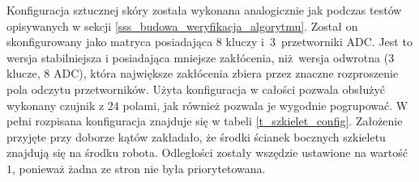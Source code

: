 Konfiguracja sztucznej skóry została wykonana analogicznie jak podczas testów opisywanych w sekcji \ref{sss_budowa_weryfikacja_algorytmu}. Został on skonfigurowany jako matryca posiadająca $8$ kluczy i~$3$~przetworniki ADC. Jest to wersja stabilniejsza i posiadająca mniejsze zakłócenia, niż~wersja odwrotna ($3$ klucze, $8$ ADC), która największe zakłócenia zbiera przez znaczne rozproszenie pola odczytu przetworników. Użyta konfiguracja w całości pozwala obsłużyć wykonany czujnik z $24$ polami, jak również pozwala je wygodnie pogrupować. W pełni rozpisana konfiguracja znajduje się w tabeli \ref{t_szkielet_config}. Założenie przyjęte przy doborze kątów zakładało, że środki ścianek bocznych szkieletu znajdują się na środku robota. Odległości zostały wszędzie ustawione na wartość $1$, ponieważ żadna ze stron nie była priorytetowana.

